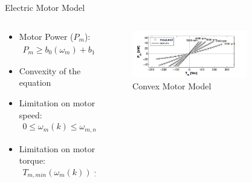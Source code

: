 \documentclass{beamer}
\begin{document}
\begin{frame}{Electric Motor Model}

\begin{columns}
\begin{column}{0.5\textwidth}
\begin{itemize}
    \item Motor Power ($P_m$): \\ \begin{align*}
        P_m \geq b_0(\omega_m) + b_1(\omega_m)T_m + b_2(\omega_m)T_m^2
    \end{align*}
    
    \item Convexity of the equation
    
    \item Limitation on motor speed:
    \begin{align*}
        0 \leq \omega_m(k) \leq \omega_{m,max}
    \end{align*}
    
    \item Limitation on motor torque:
    \begin{align*}
        T_{m,min}(\omega_m(k)) \leq T_m(k) \leq T_{m,max}(\omega_m(k))
    \end{align*}

\end{itemize}
\end{column}


\begin{column}{0.5\textwidth}
    \begin{figure}
    \centering
        \includegraphics[width=0.75\textwidth, height=1\textwidth]{Electric Motor graph.png}
        \caption{Convex Motor Model}
    \end{figure}
\end{column}

\end{columns}
\end{frame}
\end{document}
